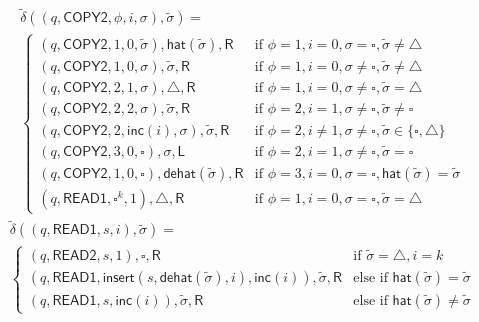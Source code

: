 \documentclass[12pt]{article}
\begin{document}
\begin{multline*}
\tilde{\delta}((q, \textsf{COPY2}, \phi, i, \sigma), \tilde{\sigma}) = \\
\begin{cases}
(q, \textsf{COPY2}, 1, 0, \tilde{\sigma}), \textsf{hat}(\tilde{\sigma}), \textsf{R} & \text{if } \phi = 1, i = 0, \sigma = \square, \tilde{\sigma} \neq \triangle \\
(q, \textsf{COPY2}, 1, 0, \sigma), \tilde{\sigma}, \textsf{R} & \text{if } \phi = 1, i = 0, \sigma \neq \square, \tilde{\sigma} \neq \triangle \\
(q, \textsf{COPY2}, 2, 1, \sigma), \triangle, \textsf{R} & \text{if } \phi = 1, i = 0, \sigma \neq \square, \tilde{\sigma} = \triangle \\
(q, \textsf{COPY2}, 2, 2, \sigma), \tilde{\sigma}, \textsf{R} & \text{if } \phi = 2, i = 1, \sigma \neq \square, \tilde{\sigma} \neq \square \\
(q, \textsf{COPY2}, 2, \textsf{inc}(i), \sigma), \tilde{\sigma}, \textsf{R} & \text{if } \phi = 2, i \neq 1, \sigma \neq \square, \tilde{\sigma} \in \{\square, \triangle\} \\
(q, \textsf{COPY2}, 3, 0, \square), \sigma, \textsf{L} & \text{if } \phi = 2, i = 1, \sigma \neq \square, \tilde{\sigma} = \square \\
(q, \textsf{COPY2}, 1, 0, \square), \textsf{dehat}(\tilde{\sigma}), \textsf{R} & \text{if } \phi = 3, i = 0, \sigma = \square, \textsf{hat}(\tilde{\sigma}) = \tilde{\sigma} \\
(q, \textsf{READ1}, \square^k, 1), \triangle, \textsf{R} & \text{if } \phi = 1, i = 0, \sigma = \square, \tilde{\sigma} = \triangle
\end{cases}
\end{multline*}
\begin{multline*}
\tilde{\delta}((q, \textsf{READ1}, s, i), \tilde{\sigma}) = \\
\begin{cases}
(q, \textsf{READ2}, s, 1), \square, \textsf{R} & \text{if } \tilde{\sigma} = \triangle, i = k \\
(q, \textsf{READ1}, \textsf{insert}(s,\textsf{dehat}(\tilde{\sigma}),i), \textsf{inc}(i)), \tilde{\sigma}, \textsf{R} & \text{else if } \textsf{hat}(\tilde{\sigma}) = \tilde{\sigma} \\
(q, \textsf{READ1}, s, \textsf{inc}(i)), \tilde{\sigma}, \textsf{R} & \text{else if } \textsf{hat}(\tilde{\sigma}) \neq \tilde{\sigma}
\end{cases}
\end{multline*}
\end{document}
